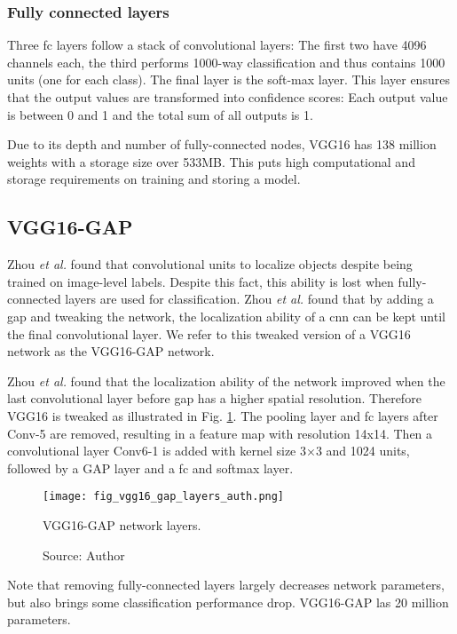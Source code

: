 \subsubsection{Fully connected layers}
Three \acrshort{fc} layers follow a stack of convolutional layers: The first two have 4096 channels each, the third performs 1000-way  classification and thus contains 1000 units (one for each class). The final layer is the soft-max layer. This layer ensures that the output values are transformed into confidence scores: Each output value is between 0 and 1 and the total sum of all outputs is 1.

Due to its depth and number of fully-connected nodes, VGG16 has 138 million weights with a storage size over 533MB. This puts high computational and storage requirements on training and storing a model.

\subsection{VGG16-GAP}
Zhou \textit{et al.} \cite{zhou2016cvpr} found that convolutional units to localize objects despite being trained on image-level labels. Despite this fact, this ability is lost when fully-connected layers are used for classification. Zhou \textit{et al.} found that by adding a \acrshort{gap} and tweaking the network, the localization ability of a \acrshort{cnn} can be kept until the final convolutional layer. We refer to this tweaked version of a VGG16 network as the VGG16-GAP network.

Zhou \textit{et al.} found that the localization ability of the network improved when the last convolutional layer before \acrshort{gap} has a higher spatial resolution. Therefore VGG16 is tweaked as illustrated in Fig. \ref{fig:vgg16_gap_layers_auth}. The pooling layer and \acrshort{fc} layers after Conv-5 are removed, resulting in a feature map with resolution 14x14. Then a convolutional layer Conv6-1 is added with kernel size 3×3 and 1024 units, followed by a GAP layer and a \acrshort{fc} and softmax layer.
\begin{figure}[ht]
    \begin{center}       
    \texttt{[image: fig\_vgg16\_gap\_layers\_auth.png]}
    \caption[VGG16-GAP network layers]{VGG16-GAP network layers.}
    \caption*{Source: Author}
    \label{fig:vgg16_gap_layers_auth}
    \end{center}
\end{figure}

Note that removing fully-connected layers largely decreases network parameters, but also brings some classification performance drop. VGG16-GAP las 20 million parameters.

